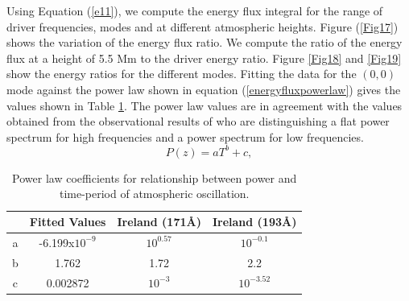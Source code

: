 \documentclass[preprint,authoryear,12pt]{elsarticle}
\begin{document}
Using Equation (\ref{e11}), we compute the energy flux integral for the range of driver frequencies, modes and at different atmospheric heights. Figure (\ref{Fig17}) shows the variation of the energy flux ratio. We compute the ratio of the energy flux at a height of 5.5 Mm to the driver energy ratio. Figure \ref{Fig18} and \ref{Fig19} show the energy ratios for the different modes. Fitting  the  data for the $(0, 0)$ mode against the power law shown in equation (\ref{energyfluxpowerlaw}) gives the values shown in Table \ref{Table3}. The power law values are in agreement with the values obtained from the observational results of \citet{Ireland2015} who are distinguishing a flat power spectrum for high frequencies and a power spectrum for low frequencies.
\begin{equation}
P(z)= aT^{b}+c,
\label{energyfluxpowerlaw}
\end{equation}
\begin{table}
\centering
\begin{tabular}{cccc}
\hline
   &  Fitted Values & Ireland (171{\AA}) & Ireland (193{\AA}) \\
\hline
a & -6.199x$10^{-9}$ &  $10^{0.57}$ & $10^{-0.1}$ \\
\hline
b & 1.762 & 1.72 & 2.2 \\
\hline
c & 0.002872 & $10^{-3}$ & $10^{-3.52}$ \\
\hline
\end{tabular} 
\caption{ Power law coefficients for relationship between power and time-period of atmospheric oscillation.}
\label{Table3}
\end{table}
\end{document}
